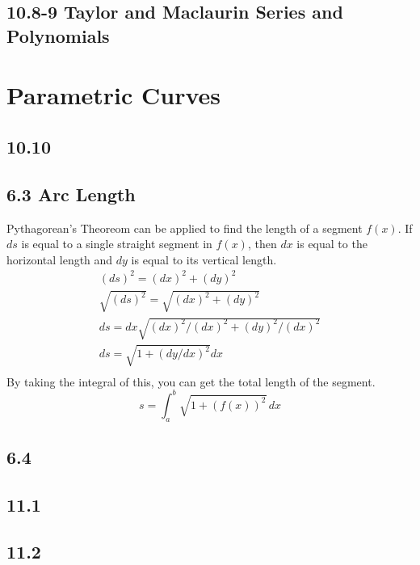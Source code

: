 \documentclass{article}
\begin{document}
        \subsection*{10.8-9 Taylor and Maclaurin Series and Polynomials }
    \section{Parametric Curves}
        \subsection*{10.10}
        \color{OliveGreen}
        \subsection*{6.3 Arc Length}
            Pythagorean's Theoreom can be applied to find the length of a segment \(f(x)\).
            If \(ds\) is equal to a single straight segment in \(f(x)\), then  \(dx\) is equal to the horizontal length and \(dy\) is equal to its vertical length. 
            \begin{equation}
                \begin{split}
                    (ds)^2 = (dx)^2 + (dy)^2 \\
                    \sqrt{(ds)^2} = \sqrt{(dx)^2 + (dy)^2}\\
                    ds = dx  \sqrt{(dx)^2 / (dx)^2 + (dy)^2 / (dx) ^2}\\
                    ds = \sqrt{1 + (dy/dx)^2}dx\\
                \end{split}
            \end{equation}
            By taking the integral of this, you can get the total length of the segment.
            \begin{equation}
                s = \int_a^b \sqrt{1 + (f(x))^2} \, dx
            \end{equation}
        \color{Black}
        \subsection*{6.4}
        \subsection*{11.1}
        \subsection*{11.2}
\end{document}
